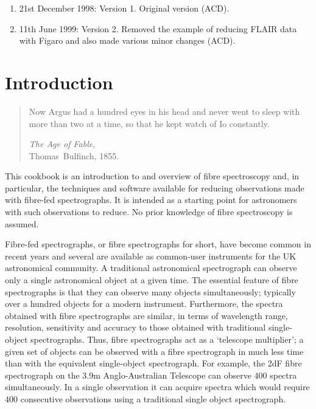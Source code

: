 \documentclass[twoside,11pt]{starlink}
\begin{document}
\scfrontmatter



\begin{enumerate}

   \item 21st December 1998: Version 1. Original version (ACD).

   \item 11th June 1999: Version 2.  Removed the example of reducing
   FLAIR data with Figaro and also made various minor changes (ACD).

\end{enumerate}

\cleardoublepage
\newpage


\section{\label{INTRO}Introduction}

\begin{quote}
Now Argus had a hundred eyes in his head and never went to sleep with
more than two at a time, so that he kept watch of Io constantly.

\emph{The Age of Fable},    \raggedleft \\
Thomas~Bulfinch, 1855.     \raggedleft

\end{quote}

This cookbook is an introduction to and overview of fibre spectroscopy
and, in particular, the techniques and software available for reducing
observations made with fibre-fed spectrographs.  It is intended as a
starting point for astronomers with such observations to reduce.  No prior
knowledge of fibre spectroscopy is assumed.

Fibre-fed spectrographs, or fibre spectrographs for short, have become
common in recent years and several are available as common-user
instruments for the UK astronomical community.  A traditional
astronomical spectrograph can observe only a single astronomical object
at a given time.  The essential feature of fibre spectrographs is that
they can observe many objects simultaneously; typically over a hundred
objects for a modern instrument.  Furthermore, the spectra obtained with
fibre spectrographs are similar, in terms of wavelength range, resolution,
sensitivity and accuracy to those obtained with traditional single-object
spectrographs.  Thus, fibre spectrographs act as a `telescope multiplier';
a given set of objects can be observed with a fibre spectrograph in much
less time than with the equivalent single-object spectrograph.  For
example, the 2dF fibre spectrograph on the 3.9m Anglo-Australian Telescope
can observe 400 spectra simultaneously.  In a single observation it can
acquire spectra which would require 400 consecutive observations using a
traditional single object spectrograph.
\end{document}
